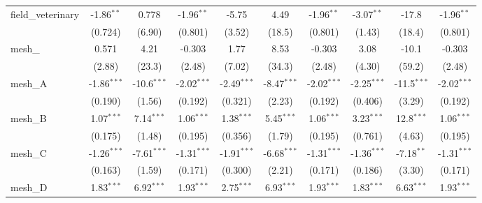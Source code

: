 \begin{tabular}{lccccccccc}
   field\_veterinary                                           & -1.86$^{**}$   & 0.778          & -1.96$^{**}$  & -5.75         & 4.49           & -1.96$^{**}$  & -3.07$^{**}$  & -17.8         & -1.96$^{**}$\\   
                                                               & (0.724)        & (6.90)         & (0.801)       & (3.52)        & (18.5)         & (0.801)       & (1.43)        & (18.4)        & (0.801)\\   
   mesh\_                                                      & 0.571          & 4.21           & -0.303        & 1.77          & 8.53           & -0.303        & 3.08          & -10.1         & -0.303\\   
                                                               & (2.88)         & (23.3)         & (2.48)        & (7.02)        & (34.3)         & (2.48)        & (4.30)        & (59.2)        & (2.48)\\   
   mesh\_A                                                     & -1.86$^{***}$  & -10.6$^{***}$  & -2.02$^{***}$ & -2.49$^{***}$ & -8.47$^{***}$  & -2.02$^{***}$ & -2.25$^{***}$ & -11.5$^{***}$ & -2.02$^{***}$\\   
                                                               & (0.190)        & (1.56)         & (0.192)       & (0.321)       & (2.23)         & (0.192)       & (0.406)       & (3.29)        & (0.192)\\   
   mesh\_B                                                     & 1.07$^{***}$   & 7.14$^{***}$   & 1.06$^{***}$  & 1.38$^{***}$  & 5.45$^{***}$   & 1.06$^{***}$  & 3.23$^{***}$  & 12.8$^{***}$  & 1.06$^{***}$\\   
                                                               & (0.175)        & (1.48)         & (0.195)       & (0.356)       & (1.79)         & (0.195)       & (0.761)       & (4.63)        & (0.195)\\   
   mesh\_C                                                     & -1.26$^{***}$  & -7.61$^{***}$  & -1.31$^{***}$ & -1.91$^{***}$ & -6.68$^{***}$  & -1.31$^{***}$ & -1.36$^{***}$ & -7.18$^{**}$  & -1.31$^{***}$\\   
                                                               & (0.163)        & (1.59)         & (0.171)       & (0.300)       & (2.21)         & (0.171)       & (0.186)       & (3.30)        & (0.171)\\   
   mesh\_D                                                     & 1.83$^{***}$   & 6.92$^{***}$   & 1.93$^{***}$  & 2.75$^{***}$  & 6.93$^{***}$   & 1.93$^{***}$  & 1.83$^{***}$  & 6.63$^{***}$  & 1.93$^{***}$\\   

\end{tabular}

